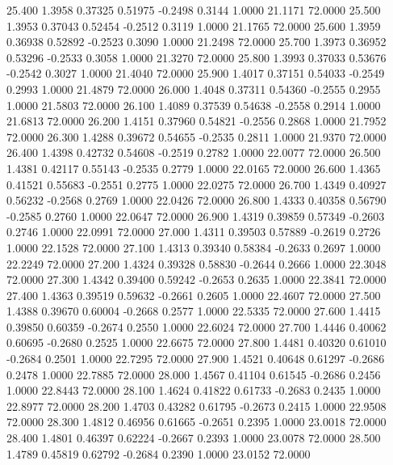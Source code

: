   25.400   1.3958   0.37325   0.51975  -0.2498   0.3144   1.0000  21.1171  72.0000
  25.500   1.3953   0.37043   0.52454  -0.2512   0.3119   1.0000  21.1765  72.0000
  25.600   1.3959   0.36938   0.52892  -0.2523   0.3090   1.0000  21.2498  72.0000
  25.700   1.3973   0.36952   0.53296  -0.2533   0.3058   1.0000  21.3270  72.0000
  25.800   1.3993   0.37033   0.53676  -0.2542   0.3027   1.0000  21.4040  72.0000
  25.900   1.4017   0.37151   0.54033  -0.2549   0.2993   1.0000  21.4879  72.0000
  26.000   1.4048   0.37311   0.54360  -0.2555   0.2955   1.0000  21.5803  72.0000
  26.100   1.4089   0.37539   0.54638  -0.2558   0.2914   1.0000  21.6813  72.0000
  26.200   1.4151   0.37960   0.54821  -0.2556   0.2868   1.0000  21.7952  72.0000
  26.300   1.4288   0.39672   0.54655  -0.2535   0.2811   1.0000  21.9370  72.0000
  26.400   1.4398   0.42732   0.54608  -0.2519   0.2782   1.0000  22.0077  72.0000
  26.500   1.4381   0.42117   0.55143  -0.2535   0.2779   1.0000  22.0165  72.0000
  26.600   1.4365   0.41521   0.55683  -0.2551   0.2775   1.0000  22.0275  72.0000
  26.700   1.4349   0.40927   0.56232  -0.2568   0.2769   1.0000  22.0426  72.0000
  26.800   1.4333   0.40358   0.56790  -0.2585   0.2760   1.0000  22.0647  72.0000
  26.900   1.4319   0.39859   0.57349  -0.2603   0.2746   1.0000  22.0991  72.0000
  27.000   1.4311   0.39503   0.57889  -0.2619   0.2726   1.0000  22.1528  72.0000
  27.100   1.4313   0.39340   0.58384  -0.2633   0.2697   1.0000  22.2249  72.0000
  27.200   1.4324   0.39328   0.58830  -0.2644   0.2666   1.0000  22.3048  72.0000
  27.300   1.4342   0.39400   0.59242  -0.2653   0.2635   1.0000  22.3841  72.0000
  27.400   1.4363   0.39519   0.59632  -0.2661   0.2605   1.0000  22.4607  72.0000
  27.500   1.4388   0.39670   0.60004  -0.2668   0.2577   1.0000  22.5335  72.0000
  27.600   1.4415   0.39850   0.60359  -0.2674   0.2550   1.0000  22.6024  72.0000
  27.700   1.4446   0.40062   0.60695  -0.2680   0.2525   1.0000  22.6675  72.0000
  27.800   1.4481   0.40320   0.61010  -0.2684   0.2501   1.0000  22.7295  72.0000
  27.900   1.4521   0.40648   0.61297  -0.2686   0.2478   1.0000  22.7885  72.0000
  28.000   1.4567   0.41104   0.61545  -0.2686   0.2456   1.0000  22.8443  72.0000
  28.100   1.4624   0.41822   0.61733  -0.2683   0.2435   1.0000  22.8977  72.0000
  28.200   1.4703   0.43282   0.61795  -0.2673   0.2415   1.0000  22.9508  72.0000
  28.300   1.4812   0.46956   0.61665  -0.2651   0.2395   1.0000  23.0018  72.0000
  28.400   1.4801   0.46397   0.62224  -0.2667   0.2393   1.0000  23.0078  72.0000
  28.500   1.4789   0.45819   0.62792  -0.2684   0.2390   1.0000  23.0152  72.0000
